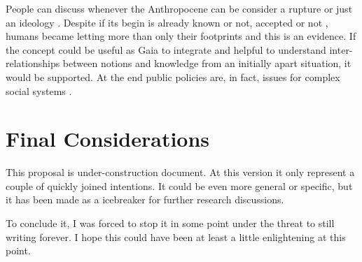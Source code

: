 \documentclass[
	12pt, %
	a4paper, %
	oneside, %
	headinclude, footinclude, %
	BCOR5mm, %
]{scrartcl}
\begin{document}
People can discuss whenever the Anthropocene can be consider a rupture \citep{hamilton_anthropocene_2016} or just an ideology \citep{baskin_ideology_2014}. Despite if its begin is already known \citep{zalasiewicz_when_2015} or not, accepted or not \citep{zalasiewicz_anthropocene:_2011}, humans became letting more than only their footprints and this is an evidence. If the concept could be useful as Gaia \citep{lovelock_gaia_1979} to integrate and helpful to understand inter-relationships between notions and knowledge from an initially apart situation, it would be supported. At the end public policies are, in fact, issues for complex social systems \citep{furtado_complexity_2015, da_silva_territory_2015}.


\section*{Final Considerations}
%

This proposal is under-construction document. At this version it only represent a couple of quickly joined intentions. It could be even more general or specific, but it has been made as a icebreaker for further research discussions.

To conclude it, I was forced to stop it in some point under the threat to still writing forever. I hope this could have been at least a little enlightening at this point.



\renewcommand{\refname}{\spacedlowsmallcaps{References}}

%


\end{document}
